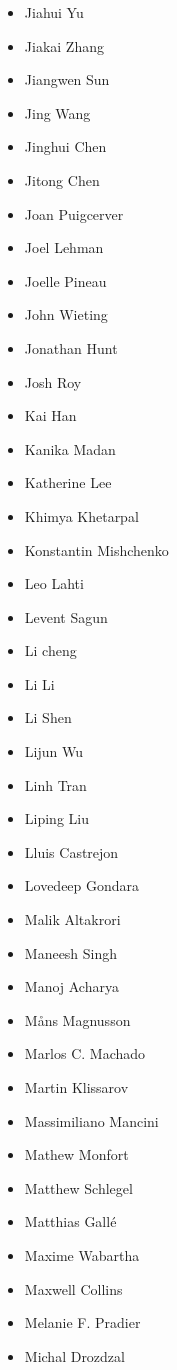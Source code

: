 \begin{multicols}{4}
\begin{itemize}[label={}]
    \item Jiahui Yu
    \item Jiakai Zhang
    \item Jiangwen Sun
    \item Jing Wang
    \item Jinghui Chen
    \item Jitong Chen
    \item Joan Puigcerver
    \item Joel Lehman
    \item Joelle Pineau
    \item John Wieting
    \item Jonathan Hunt
    \item Josh Roy
    \item Kai Han
    \item Kanika Madan
    \item Katherine Lee
    \item Khimya Khetarpal
    \item Konstantin Mishchenko
    \item Leo Lahti
    \item Levent Sagun
    \item Li cheng
    \item Li Li
    \item Li Shen
    \item Lijun Wu
    \item Linh Tran
    \item Liping Liu
    \item Lluis Castrejon
    \item Lovedeep Gondara
    \item Malik Altakrori
    \item Maneesh Singh
    \item Manoj Acharya
    \item Måns Magnusson
    \item Marlos C. Machado
    \item Martin Klissarov
    \item Massimiliano Mancini
    \item Mathew Monfort
    \item Matthew Schlegel
    \item Matthias Gallé
    \item Maxime Wabartha
    \item Maxwell Collins
    \item Melanie F. Pradier
    \item Michal Drozdzal

\end{itemize}
\end{multicols}
